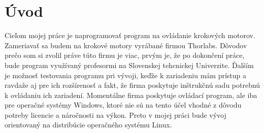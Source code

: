 \chapter*{Úvod}

Cieľom mojej práce je naprogramovať program na ovládanie krokových motorov. Zameriavať sa budem na krokové motory
vyrábané firmou Thorlabs. Dôvodov prečo som si zvolil práve túto firmu je viac, prvým je, že po dokončení práce, bude
program využívaný profesormi na Slovenskej tehcnickej Univerzite. Ďalším je možnosť testovania programu pri vývoji, keďže 
k zariadeniu mám prístup a ravdaže aj pre ich rozšírenosť a fakt, že firma poskytuje inštrukčnú sadu potrebnú k ovládaniu
ich zariadení. Momentálne firma poskytuje ovládací program, ale iba pre operačné systémy Windows, ktoré nie sú na tento 
účel vhodné z dôvodu potreby licencie a náročnosti na výkon. Preto v mojej práci bude vývoj orientovaný na distribúcie
operačného systému Linux. 


